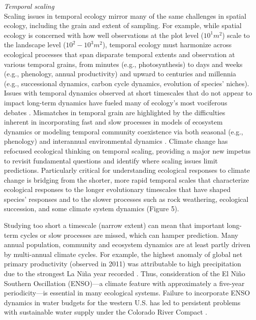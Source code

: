 \documentclass[11pt,a4paper,oneside]{article}
\begin{document}
\noindent \emph{Temporal scaling}\\ 
\noindent Scaling issues in temporal ecology mirror many of the same challenges in spatial ecology, including the grain and extent of sampling. For example, while spatial ecology is concerned with how well observations at the plot level ($10^{1}m^2$) scale to the landscape level ($10^{2}-10^{3}m^2$), temporal ecology must harmonize across ecological processes that span disparate temporal extents and observation at various temporal grains, from minutes (e.g., photosynthesis) to days and weeks (e.g., phenology, annual productivity) and upward to centuries and millennia (e.g., successional dynamics, carbon cycle dynamics, evolution of species' niches). Issues with temporal dynamics observed at short timescales that do not appear to impact long-term dynamics have fueled many of ecology's most vociferous debates \citep{wiens1986}. Mismatches in temporal grain are highlighted by the difficulties inherent in incorporating fast and slow processes in models of ecosystem dynamics \citep{Carpenter2000} or modeling temporal community coexistence via both seasonal (e.g., phenology) and interannual environmental dynamics \citep{Chesson:1997dz}. Climate change has refocused ecological thinking on temporal scaling, providing a major new impetus to revisit fundamental questions and identify where scaling issues limit predictions. Particularly critical for understanding ecological responses to climate change is bridging from the shorter, more rapid temporal scales that characterize ecological responses to the longer evolutionary timescales that have shaped species' responses and to the slower processes such as rock weathering, ecological succession, and some climate system dynamics (Figure 5). 

Studying too short a timescale (narrow extent) can mean that important long-term cycles or slow processes are missed, which can hamper prediction. Many annual population, community and ecosystem dynamics are at least partly driven by multi-annual climate cycles. For example, the highest anomaly of global net primary productivity (observed in 2011) was attributable to high precipitation due to the strongest La Ni\~na year recorded \citep{bastos2013}. Thus, consideration of the El Ni\~no Southern Oscillation (ENSO)---a climate feature with approximately a five-year periodicity---is essential in many ecological systems. Failure to incorporate ENSO dynamics in water budgets for the western U.S. has led to persistent problems with sustainable water supply under the Colorado River Compact \citep{Christensen2004}. 
\end{document}
